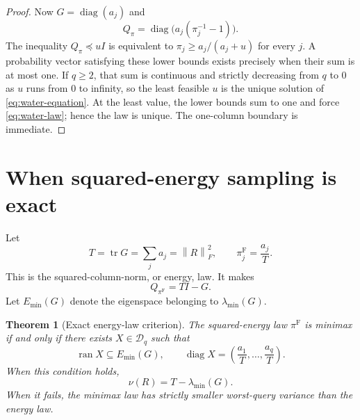 \documentclass[11pt]{article}
\newtheorem{theorem}{Theorem}[section]
\theoremstyle{definition}
\newcommand{\D}{\mathcal D}
\newcommand{\tr}{\operatorname{tr}}
\newcommand{\diag}{\operatorname{diag}}
\newcommand{\ran}{\operatorname{ran}}
\newcommand{\norm}[1]{\left\lVert #1\right\rVert}
\begin{document}
\begin{proof}
Now $G=\diag(a_j)$ and
\[
  Q_\pi=\diag\bigl(a_j(\pi_j^{-1}-1)\bigr).
\]
The inequality $Q_\pi\preceq uI$ is equivalent to
$\pi_j\ge a_j/(a_j+u)$ for every $j$.  A probability vector satisfying these lower bounds
exists precisely when their sum is at most one.  If $q\ge2$, that sum is continuous and strictly
decreasing from $q$ to $0$ as $u$ runs from $0$ to infinity, so the least feasible $u$ is the
unique solution of \eqref{eq:water-equation}.  At the least value, the lower bounds sum to one
and force \eqref{eq:water-law}; hence the law is unique.  The one-column boundary is immediate.
\end{proof}

\section{When squared-energy sampling is exact}

Let
\[
  T=\tr G=\sum_ja_j=\norm{R}_F^2,
  \qquad \pi_j^{\mathrm F}=\frac{a_j}{T}.
\]
This is the squared-column-norm, or energy, law.  It makes
\begin{equation}
  Q_{\pi^{\mathrm F}}=TI-G.
  \label{eq:frob-covariance}
\end{equation}
Let $E_{\min}(G)$ denote the eigenspace belonging to $\lambda_{\min}(G)$.

\begin{theorem}[Exact energy-law criterion]
\label{thm:energy-criterion}
The squared-energy law $\pi^{\mathrm F}$ is minimax if and only if there exists $X\in\D_q$ such
that
\begin{equation}
  \ran X\subseteq E_{\min}(G),
  \qquad
  \diag X=\left(\frac{a_1}{T},\ldots,\frac{a_q}{T}\right).
  \label{eq:energy-criterion}
\end{equation}
When this condition holds,
\begin{equation}
  \nu(R)=T-\lambda_{\min}(G).
  \label{eq:energy-value}
\end{equation}
When it fails, the minimax law has strictly smaller worst-query variance than the energy law.
\end{theorem}
\end{document}
